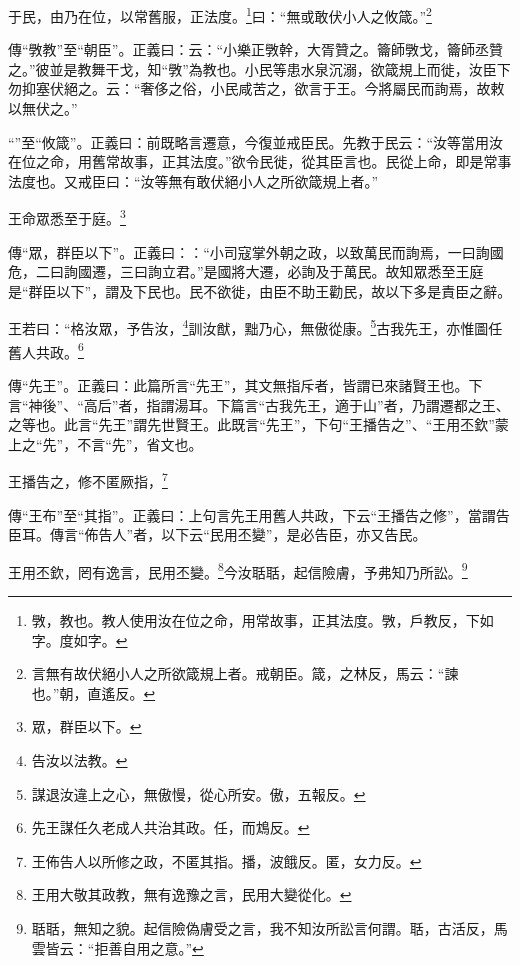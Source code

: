 于民，由乃在位，以常舊服，正法度。\footnote{斆，教也。教人使用汝在位之命，用常故事，正其法度。斆，戶教反，下如字。度如字。}曰：“無或敢伏小人之攸箴。”\footnote{言無有故伏絕小人之所欲箴規上者。戒朝臣。箴，之林反，馬云：“諫也。”朝，直遙反。}


{\noindent\zhuan{}\fzbyks 傳“斆教”至“朝臣”。正義曰：云：“小樂正斆幹，大胥贊之。籥師斆戈，籥師丞贊之。”彼並是教舞干戈，知“斆”為教也。小民等患水泉沉溺，欲箴規上而徙，汝臣下勿抑塞伏絕之。云：“奢侈之俗，小民咸苦之，欲言于王。今將屬民而詢焉，故敕以無伏之。” \par}

{\noindent\shu{}\fzkt “”至“攸箴”。正義曰：前既略言遷意，今復並戒臣民。先教于民云：“汝等當用汝在位之命，用舊常故事，正其法度。”欲令民徙，從其臣言也。民從上命，即是常事法度也。又戒臣曰：“汝等無有敢伏絕小人之所欲箴規上者。” \par}

王命眾悉至于庭。\footnote{眾，群臣以下。}

{\noindent\zhuan{}\fzbyks 傳“眾，群臣以下”。正義曰：：“小司寇掌外朝之政，以致萬民而詢焉，一曰詢國危，二曰詢國遷，三曰詢立君。”是國將大遷，必詢及于萬民。故知眾悉至王庭是“群臣以下”，謂及下民也。民不欲徙，由臣不助王勸民，故以下多是責臣之辭。 \par}

王若曰：“格汝眾，予告汝，\footnote{告汝以法教。}訓汝猷，黜乃心，無傲從康。\footnote{謀退汝違上之心，無傲慢，從心所安。傲，五報反。}古我先王，亦惟圖任舊人共政。\footnote{先王謀任久老成人共治其政。任，而鴆反。}

{\noindent\zhuan{}\fzbyks 傳“先王”。正義曰：此篇所言“先王”，其文無指斥者，皆謂已來諸賢王也。下言“神後”、“高后”者，指謂湯耳。下篇言“古我先王，適于山”者，乃謂遷都之王、之等也。此言“先王”謂先世賢王。此既言“先王”，下句“王播告之”、“王用丕欽”蒙上之“先”，不言“先”，省文也。 \par}

王播告之，修不匿厥指，\footnote{王佈告人以所修之政，不匿其指。播，波餓反。匿，女力反。}

{\noindent\zhuan{}\fzbyks 傳“王布”至“其指”。正義曰：上句言先王用舊人共政，下云“王播告之修”，當謂告臣耳。傳言“佈告人”者，以下云“民用丕變”，是必告臣，亦又告民。 \par}

王用丕欽，罔有逸言，民用丕變。\footnote{王用大敬其政教，無有逸豫之言，民用大變從化。}今汝聒聒，起信險膚，予弗知乃所訟。\footnote{聒聒，無知之貌。起信險偽膚受之言，我不知汝所訟言何謂。聒，古活反，馬雲皆云：“拒善自用之意。”}

